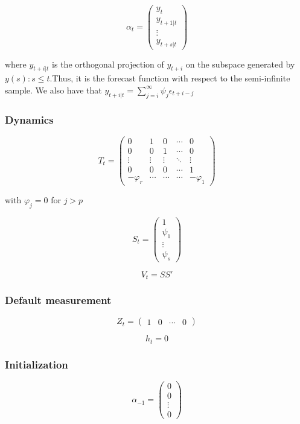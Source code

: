 \documentclass[
  letterpaper,
  DIV=11,
  numbers=noendperiod]{scrreprt}
\begin{document}
\[ \alpha_t= \begin{pmatrix} y_t \\ y_{t+1|t} \\ \vdots \\ y_{t+s|t} \end{pmatrix}\]

where \(y_{t+i|t}\) is the orthogonal projection of \(y_{t+i}\) on the
subspace generated by \({y\left(s\right):s \leq t}\).Thus, it is the
forecast function with respect to the semi-infinite sample. We also have
that \(y_{t+i|t} = \sum_{j=i}^\infty {\psi_j \epsilon_{t+i-j}}\)

\subsubsection{Dynamics}\label{dynamics}

\[ T_t = \begin{pmatrix}0 &1 & 0 & \cdots & 0  \\0& 0 & 1 & \cdots & 0\\ \vdots & \vdots & \vdots & \ddots & \vdots\\ 0 & 0 & 0 & \cdots & 1\\
-\varphi_r & \cdots  & \cdots & \cdots &-\varphi_1 \end{pmatrix}\]

with \(\varphi_{j}=0\) for \(j>p\)

\[ S_t = \begin{pmatrix}1 \\ \psi_1 \\ \vdots\\ \psi_s \end{pmatrix} \]

\[ V_t = S S' \]

\subsubsection{Default measurement}\label{default-measurement}

\[ Z_t = \begin{pmatrix} 1 & 0 & \cdots & 0\end{pmatrix}\]

\[ h_t = 0 \]

\subsubsection{Initialization}\label{initialization}

\[ \alpha_{-1} = \begin{pmatrix}0 \\ 0 \\ \vdots\\ 0 \end{pmatrix} \]
\end{document}

